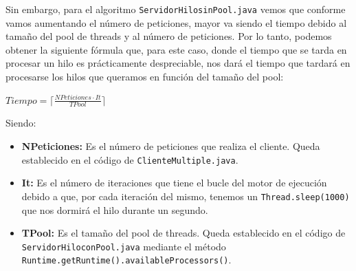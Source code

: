 \documentclass[12pt,letterpaper]{article}
\begin{document}
Sin embargo, para el algoritmo \texttt{ServidorHilosinPool.java} vemos que conforme vamos aumentando el número de peticiones, mayor va siendo el tiempo debido al tamaño del pool de threads y al número de peticiones. Por lo tanto, podemos obtener la siguiente fórmula que, para este caso, donde el tiempo que se tarda en procesar un hilo es prácticamente despreciable, nos dará el tiempo que tardará en procesarse los hilos que queramos en función del tamaño del pool:
\begin{center}
	$Tiempo = \lceil{\frac{NPeticiones\cdot It}{TPool}}\rceil$
\end{center}
Siendo:
\begin{itemize}
	\item \textbf{NPeticiones:} Es el número de peticiones que realiza el cliente. Queda establecido en el código de \texttt{ClienteMultiple.java}.
	\item \textbf{It:} Es el número de iteraciones que tiene el bucle del motor de ejecución debido a que, por cada iteración del mismo, tenemos un \texttt{Thread.sleep(1000)} que nos dormirá el hilo durante un segundo.
	\item \textbf{TPool:} Es el tamaño del pool de threads. Queda establecido en el código de \texttt{ServidorHiloconPool.java} mediante el método \texttt{Runtime.getRuntime().availableProcessors()}.
\end{itemize}
\end{document}
